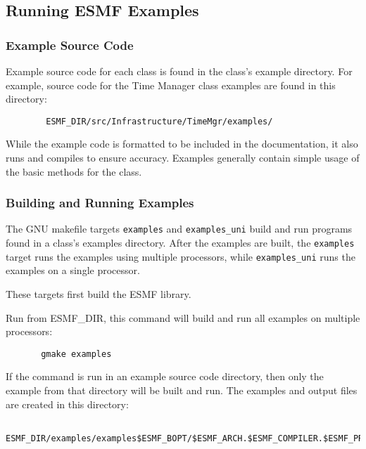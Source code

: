 
\subsection{Running ESMF Examples}
\label{examples}


\subsubsection{Example Source Code}

Example source code for each class is found in the class's example
directory. For example, source code for the Time Manager class examples
are found in this directory:

\begin{verbatim}
        ESMF_DIR/src/Infrastructure/TimeMgr/examples/
\end{verbatim}

While the example code is formatted to be included in the documentation,
it also runs and compiles to ensure accuracy.  Examples generally 
contain simple usage of the basic methods for the class.

\subsubsection{Building and Running Examples}

The GNU makefile targets {\tt examples} and {\tt examples\_uni} build
and run programs found in a class's examples directory.  After the
examples are built, the {\tt examples} target runs the examples using
multiple processors, while {\tt examples\_uni} runs the examples on
a single processor.

These targets first build the ESMF library.

Run from ESMF\_DIR, this command will build and run all examples on
multiple processors:

\begin{verbatim}
       gmake examples
\end{verbatim}

If the command is run in an example source code directory, then only
the example from that directory will be built and run.  The examples
and output files are created in this directory:

\begin{verbatim}
       ESMF_DIR/examples/examples$ESMF_BOPT/$ESMF_ARCH.$ESMF_COMPILER.$ESMF_PREC.$ESMF_SITE/
\end{verbatim}

